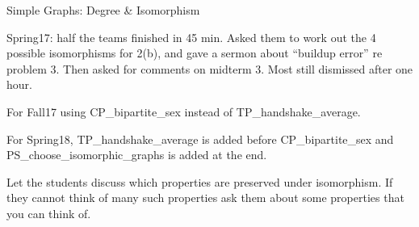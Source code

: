\documentclass[handout]{mcs}
\begin{document}


\begin{staffnotes}
Simple Graphs: Degree \& Isomorphism

Spring17: half the teams finished in 45 min.  Asked them to work out
the 4 possible isomorphisms for 2(b), and gave a sermon about
``buildup error'' re problem 3.  Then asked for comments on midterm 3.
Most still dismissed after one hour.

For Fall17 using CP\_bipartite\_sex instead of TP\_handshake\_average.

For Spring18, TP\_handshake\_average is added before CP\_bipartite\_sex and PS\_choose\_isomorphic\_graphs is added at the end.
\end{staffnotes}






\begin{staffnotes}
Let the students discuss which properties are preserved under isomorphism. If they cannot think of many such properties ask them about some properties that you can think of.
\end{staffnotes}

\end{document}
